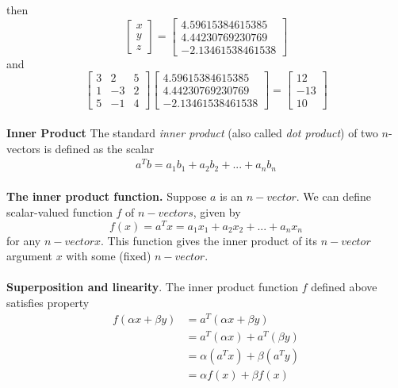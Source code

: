 \documentclass[a4paper, 12pt]{article}
\begin{document}
then 
\[
\left[{
\begin{array}{c}
x \\
y \\
z
\end{array}
}\right] 
=
\left[{
\begin{array}{c}
4.59615384615385 \\
4.44230769230769 \\
-2.13461538461538
\end{array}
}\right] 
\]
and
\[
\left[{
\begin{array}{ccc}
3 & 2 & 5 \\
1 & -3  & 2\\
5 & -1  & 4
\end{array}
} \right]
\left[{
\begin{array}{c}
4.59615384615385 \\
4.44230769230769 \\
-2.13461538461538
\end{array}
}\right] 
=
\left[{
\begin{array}{c} 
12 \\
-13 \\
10
\end{array}
} \right] 
\]
\\
\textbf{Inner Product}
The standard \textit{inner product} (also called \textit{dot product}) of 
two $n$-vectors is defined as the scalar
\begin{align*}
a^Tb = a_1b_1 + a_2b_2 + ... + a_nb_n
\end{align*}
\\
\textbf{The inner product function.} Suppose $a$ is an $n-vector$. We can define scalar-valued
function $f$ of $n-vectors$, given by
\begin{equation}
f(x) = a^Tx = a_1x_1 + a_2x_2+...+a_nx_n
\end{equation}
for any $n-vector x$. This function gives the inner product of its $n-vector$ argument $x$ with
some (fixed) $n-vector$.
\\
\\
\textbf{Superposition and linearity}. The inner product function $f$ defined above satisfies
property
\begin{align*}
f(\alpha x +\beta y) &= a^T(\alpha x + \beta y) \\
&= a^T(\alpha x) + a^T(\beta y) \\
&= \alpha(a^Tx) + \beta(a^Ty) \\
&= \alpha f(x) + \beta f(x)
\end{align*}
\\
\end{document}
